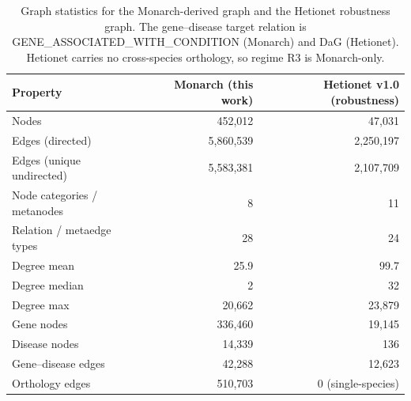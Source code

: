 \begin{table}[H]
\centering
\caption{Graph statistics for the Monarch-derived graph and the Hetionet robustness graph. The gene--disease target relation is GENE\_ASSOCIATED\_WITH\_CONDITION (Monarch) and DaG (Hetionet). Hetionet carries no cross-species orthology, so regime R3 is Monarch-only.}
\label{tab:graph_stats}
\begin{tabular}{lrr}
\toprule
Property & Monarch (this work) & Hetionet v1.0 (robustness) \\
\midrule
Nodes & 452,012 & 47,031 \\
Edges (directed) & 5,860,539 & 2,250,197 \\
Edges (unique undirected) & 5,583,381 & 2,107,709 \\
Node categories / metanodes & 8 & 11 \\
Relation / metaedge types & 28 & 24 \\
Degree mean & 25.9 & 99.7 \\
Degree median & 2 & 32 \\
Degree max & 20,662 & 23,879 \\
Gene nodes & 336,460 & 19,145 \\
Disease nodes & 14,339 & 136 \\
Gene--disease edges & 42,288 & 12,623 \\
Orthology edges & 510,703 & 0 (single-species) \\
\bottomrule
\end{tabular}
\end{table}
